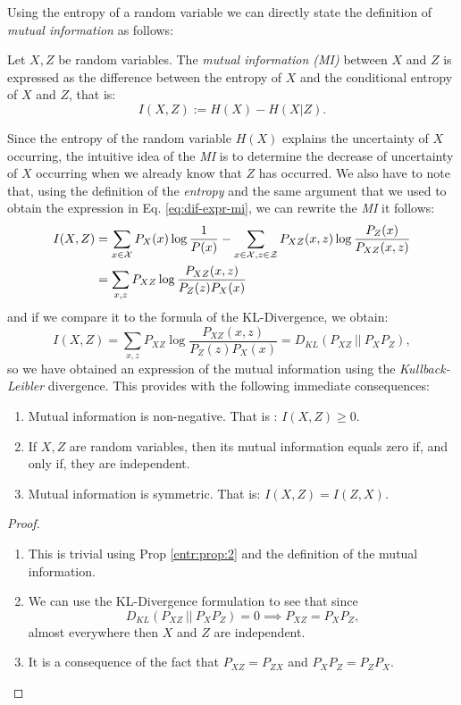 
\label{Chapter:MI}
Using the entropy of a random variable we can directly state the definition of \emph{mutual information} as follows:

\begin{ndefC}
Let $X,Z$ be random variables. The \emph{mutual information (MI)} between $X$ and $Z$ is expressed as the difference between the entropy of $X$ and the conditional entropy of $X$ and $Z$, that is:
$$
I(X,Z) := H(X) - H(X|Z).
$$
\end{ndefC}
Since the entropy of the random variable $H(X)$ explains the uncertainty of $X$ occurring, the intuitive idea of the \emph{MI} is to determine the decrease of uncertainty of $X$ occurring when we already
know that $Z$ has occurred. We also have to note that, using the definition of the \emph{entropy} and the same argument that we used to obtain the expression in Eq. \ref{eq:dif-expr-mi}, we can rewrite the \emph{MI}  it follows:
\begin{align}
I(X,Z) & = \sum_{x \in \mathcal{X}}P_X(x) \log \frac{1}{P(x)} - \sum_{x \in \mathcal{X}, z \in \mathcal Z} P_{XZ}(x,z) \log \frac{P_Z(x)}{P_{XZ}(x,z)} \nonumber \\
 & = \sum_{x,z}P_{XZ}\log \frac{P_{XZ}(x,z)}{P_Z(z)P_X(x)} \label{MI:sum:xz}
\end{align}
and if we compare it to the formula of the KL-Divergence, we obtain:
\[
I(X,Z)  = \sum_{x,z}P_{XZ}\log \frac{P_{XZ}(x,z)}{P_Z(z)P_X(x)} = D_{KL}(P_{XZ} \ || \ P_X P_Z),
\]
so we have obtained an expression of the mutual information using the \emph{Kullback-Leibler} divergence. This provides with the following immediate consequences:

\begin{corollary}

\begin{enumerate}[label=$(\roman*)$]
\item Mutual information is non-negative. That is : $I(X,Z) \geq 0$.
\item If $X,Z$ are random variables, then its mutual information equals zero if, and only if, they are independent. 

\item Mutual information is symmetric. That is: $I(X,Z) = I(Z,X)$.
\end{enumerate}
\end{corollary}

\begin{proof}
    \begin{enumerate}[label=$(\roman*)$]
        \item This is trivial using Prop \ref{entr:prop:2} and the definition of the mutual information.
        \item We can use the KL-Divergence formulation to see that since $$
        D_{KL}(P_{XZ} \ || \ P_X P_Z) = 0 \implies P_{XZ} = P_X P_Z,
        $$ 
        almost everywhere then $X$ and $Z$ are independent.
        \item It is a consequence of the fact that $P_{XZ} = P_{ZX}$ and $P_X P_Z = P_Z P_X$.
        \end{enumerate}
\end{proof}

